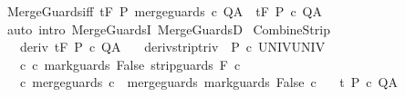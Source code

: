 \begin{isabellebody}
%
\endisatagproof
{\isafoldproof}%
%
\isadelimproof
\isanewline
%
\endisadelimproof
\isanewline
{}\isamarkupfalse%
\ MergeGuards{\isacharunderscore}iff{\isacharcolon}\ {\isachardoublequoteopen}{\isasymGamma}{\isacharcomma}{\isasymTheta}{\isasymturnstile}\isactrlsub t\isactrlbsub {\isacharslash}F\isactrlesub \ P\ merge{\isacharunderscore}guards\ c\ Q{\isacharcomma}A\ {\isacharequal}\ {\isasymGamma}{\isacharcomma}{\isasymTheta}{\isasymturnstile}\isactrlsub t\isactrlbsub {\isacharslash}F\isactrlesub \ P\ c\ Q{\isacharcomma}A{\isachardoublequoteclose}\isanewline
%
\isadelimproof
\ \ %
\endisadelimproof
%
\isatagproof
{}\isamarkupfalse%
\ {\isacharparenleft}auto\ intro{\isacharcolon}\ MergeGuardsI\ MergeGuardsD{\isacharparenright}%
\endisatagproof
{\isafoldproof}%
%
\isadelimproof
\isanewline
%
\endisadelimproof
\isanewline
{}\isamarkupfalse%
\ CombineStrip{\isacharprime}{\isacharcolon}\ \isanewline
\ \ \ deriv{\isacharcolon}\ {\isachardoublequoteopen}{\isasymGamma}{\isacharcomma}{\isasymTheta}{\isasymturnstile}\isactrlsub t\isactrlbsub {\isacharslash}F\isactrlesub \ P\ c{\isacharprime}\ Q{\isacharcomma}A{\isachardoublequoteclose}\isanewline
\ \ \ deriv{\isacharunderscore}strip{\isacharunderscore}triv{\isacharcolon}\ {\isachardoublequoteopen}{\isasymGamma}{\isacharcomma}{\isacharbraceleft}{\isacharbraceright}{\isasymturnstile}\isactrlbsub {\isacharslash}{\isacharbraceleft}{\isacharbraceright}\isactrlesub \ P\ c{\isacharprime}{\isacharprime}\ UNIV{\isacharcomma}UNIV{\isachardoublequoteclose}\isanewline
\ \ \ c{\isacharprime}{\isacharprime}{\isacharcolon}\ {\isachardoublequoteopen}c{\isacharprime}{\isacharprime}{\isacharequal}\ mark{\isacharunderscore}guards\ False\ {\isacharparenleft}strip{\isacharunderscore}guards\ {\isacharparenleft}{\isacharminus}F{\isacharparenright}\ c{\isacharprime}{\isacharparenright}{\isachardoublequoteclose}\isanewline
\ \ \ c{\isacharcolon}\ {\isachardoublequoteopen}merge{\isacharunderscore}guards\ c\ {\isacharequal}\ merge{\isacharunderscore}guards\ {\isacharparenleft}mark{\isacharunderscore}guards\ False\ c{\isacharprime}{\isacharparenright}{\isachardoublequoteclose}\isanewline
\ \ \ {\isachardoublequoteopen}{\isasymGamma}{\isacharcomma}{\isasymTheta}{\isasymturnstile}\isactrlsub t\isactrlbsub {\isacharslash}{\isacharbraceleft}{\isacharbraceright}\isactrlesub \ P\ c\ Q{\isacharcomma}A{\isachardoublequoteclose}\isanewline
%
\isadelimproof
%
\endisadelimproof
%
\isatagproof
{}\isamarkupfalse%

\end{isabellebody}
